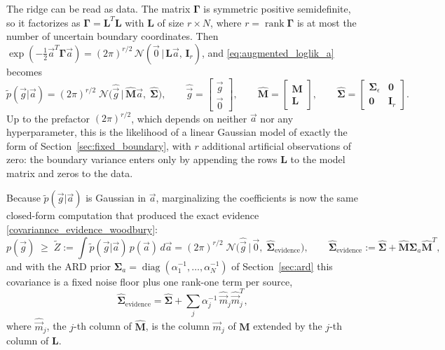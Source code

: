 \documentclass{article}
\begin{document}
The ridge can be read as data. The matrix $\mathbf\Gamma$ is symmetric positive semidefinite, so it factorizes as $\mathbf\Gamma = \mathbf L^T\mathbf L$ with $\mathbf L$ of size $r\times N$, where $r = \operatorname{rank}\mathbf\Gamma$ is at most the number of uncertain boundary coordinates. Then $\exp(-\frac12\vec a^T\mathbf\Gamma\vec a) = (2\pi)^{r/2}\,\mathcal N(\vec 0\,|\,\mathbf L\vec a,\,\mathbf I_r)$, and \eqref{eq:augmented_loglik_a} becomes
\begin{equation}
    \tilde p(\vec g|\vec a) = (2\pi)^{r/2}\;\mathcal N\big(\hat{\vec g}\,\big|\,\hat{\mathbf M}\vec a,\;\hat{\mathbf\Sigma}\big), \qquad
    \hat{\vec g} = \begin{bmatrix}\vec g\\ \vec 0\end{bmatrix}, \qquad
    \hat{\mathbf M} = \begin{bmatrix}\mathbf M\\ \mathbf L\end{bmatrix}, \qquad
    \hat{\mathbf\Sigma} = \begin{bmatrix}\mathbf{\Sigma}_\epsilon & \mathbf 0\\ \mathbf 0 & \mathbf I_r\end{bmatrix}. \label{eq:augmented_model}
\end{equation}
Up to the prefactor $(2\pi)^{r/2}$, which depends on neither $\vec a$ nor any hyperparameter, this is the likelihood of a linear Gaussian model of exactly the form of Section~\ref{sec:fixed_boundary}, with $r$ additional artificial observations of zero: the boundary variance enters only by appending the rows $\mathbf L$ to the model matrix and zeros to the data.

Because $\tilde p(\vec g|\vec a)$ is Gaussian in $\vec a$, marginalizing the coefficients is now the same closed-form computation that produced the exact evidence \eqref{covariannce_evidence_woodbury}:
\begin{equation}
    p(\vec g) \;\ge\; \tilde Z := \int \tilde p(\vec g|\vec a)\,p(\vec a)\,d\vec a
    = (2\pi)^{r/2}\;\mathcal N\big(\hat{\vec g}\,\big|\,\vec 0,\;\hat{\mathbf\Sigma}_{\text{evidence}}\big), \qquad
    \hat{\mathbf\Sigma}_{\text{evidence}} := \hat{\mathbf\Sigma} + \hat{\mathbf M}\mathbf{\Sigma}_a\hat{\mathbf M}^T, \label{eq:evidence_bound}
\end{equation}
and with the ARD prior $\mathbf{\Sigma}_a = \operatorname{diag}(\alpha_1^{-1},\ldots,\alpha_N^{-1})$ of Section~\ref{sec:ard} this covariance is a fixed noise floor plus one rank-one term per source,
\begin{equation}
    \hat{\mathbf\Sigma}_{\text{evidence}} = \hat{\mathbf\Sigma} + \sum_j \alpha_j^{-1}\,\hat{\vec m}_j\hat{\vec m}_j^T, \label{eq:evidence_bound_cov}
\end{equation}
where $\hat{\vec m}_j$, the $j$-th column of $\hat{\mathbf M}$, is the column $\vec m_j$ of $\mathbf M$ extended by the $j$-th column of $\mathbf L$.
\end{document}
